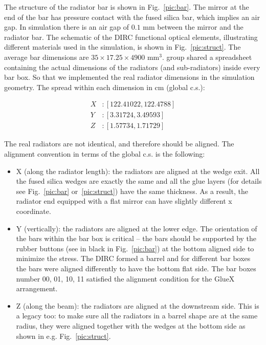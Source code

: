 The structure of the radiator bar is shown in Fig.~\ref{pic:bar}. The mirror at the end of the bar has pressure contact with the fused silica bar, which implies an air gap. In simulation there is an air gap of $0.1$ mm between the mirror and the radiator bar. The schematic of the \gluex DIRC functional optical elements, illustrating different materials used in the simulation, is shown in Fig.~\ref{pic:struct}. 
The average bar dimensions are $35 \times 17.25 \times 4900 $ mm$^3$. \babar group shared a spreadsheet containing the actual dimensions of the radiators (and sub-radiators) inside every bar box. So that we implemented the real radiator dimensions in the simulation geometry. The spread within each dimension in cm (global c.s.):

\begin{align}
X &:  [122.41022, 122.4788] \\
Y &:  [3.31724, 3.49593] \\
Z &:  [1.57734, 1.71729]
\end{align}

The real radiators are not identical, and therefore should be aligned. The alignment convention in terms of the global c.s. is the following:

\begin{itemize}
\item X (along the radiator length): the radiators are aligned at the wedge exit. All the fused silica wedges are exactly the same and all the glue layers (for details see Fig.~\ref{pic:bar} or~\ref{pic:struct}) have the same thickness. As a result, the radiator end equipped with a flat mirror can have slightly different x coordinate.
\item Y (vertically): the radiators are aligned at the lower edge. The orientation of the bars within the bar box is critical -- the bars should be supported by the rubber buttons (see in black in Fig.~\ref{pic:bar}) at the bottom aligned side to minimize the stress. The \babar DIRC formed a barrel and for different bar boxes the bars were aligned differently to have the bottom flat side. The \babar bar boxes number 00, 01, 10, 11 satisfied the alignment condition for the GlueX arrangement.
\item Z (along the beam): the radiators are aligned at the downstream side. This is a \babar legacy too: to make sure all the radiators in a barrel shape are at the same radius, they were aligned together with the wedges at the bottom side as shown in e.g. Fig.~\ref{pic:struct}.
\end{itemize}

